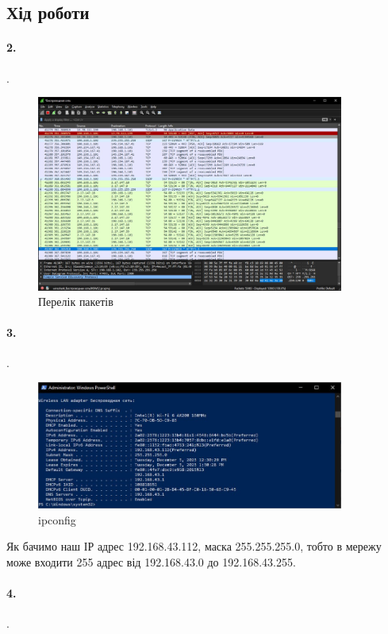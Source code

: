 \documentclass[12pt]{extarticle}
\begin{document}
\break
\subsection*{Хід роботи}
\paragraph{2.}.

\vspace{12pt}

\begin{figure}[H]
    \centering
    \includegraphics[width=0.90\textwidth]{ips}
    \caption{Перелік пакетів}
\end{figure}


\paragraph{3.}.
\begin{figure}[H]
    \centering
    \includegraphics[width=0.90\textwidth]{ipconfig}
    \caption{ipconfig}
\end{figure}

Як бачимо наш ІР адрес 192.168.43.112, маска 255.255.255.0, тобто
в мережу може входити 255 адрес від 192.168.43.0 до 192.168.43.255.

\break
\paragraph{4.}.
\end{document}
